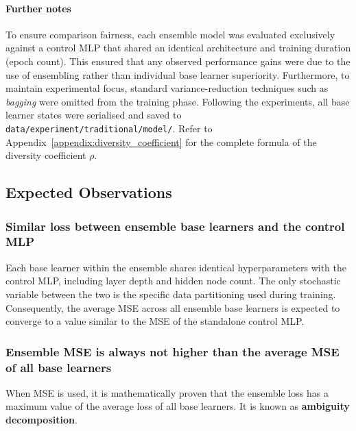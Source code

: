 \documentclass{article}
\begin{document}
\paragraph{Further notes}
To ensure comparison fairness, each ensemble model was evaluated exclusively against a control MLP that shared an identical architecture and training duration (epoch count). This ensured that any observed performance gains were due to the use of ensembling rather than individual base learner superiority. Furthermore, to maintain experimental focus, standard variance-reduction techniques such as \textit{bagging} were omitted from the training phase. Following the experiments, all base learner states were serialised and saved to \texttt{data/experiment/traditional/model/}. Refer to Appendix~\ref{appendix:diversity_coefficient} for the complete formula of the diversity coefficient $\rho$. 


\subsection{Expected Observations}


\subsubsection{Similar loss between ensemble base learners and the control MLP}
Each base learner within the ensemble shares identical hyperparameters with the control MLP, including layer depth and hidden node count. The only stochastic variable between the two is the specific data partitioning used during training. Consequently, the average MSE across all ensemble base learners is expected to converge to a value similar to the MSE of the standalone control MLP. 


\subsubsection{Ensemble MSE is always not higher than the average MSE of all base learners}
When MSE is used, it is mathematically proven that the ensemble loss has a maximum value of the average loss of all base learners. It is known as \textbf{ambiguity decomposition}. 
\end{document}
